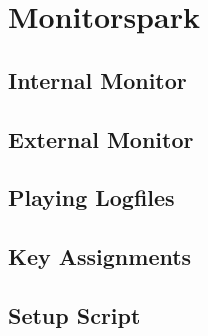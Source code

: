 \chapter{Monitorspark}

\section{Internal Monitor}

\section{External Monitor}

\section{Playing Logfiles}

\section{Key Assignments}

\section{Setup Script}


